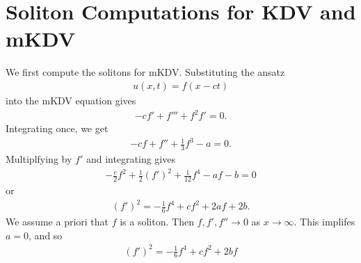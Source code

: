 \documentclass[12pt,reqno]{amsart}
\numberwithin{equation}{section}  %
\begin{document}
        \section{Soliton Computations for KDV and mKDV}
        We first compute the solitons for mKDV. Substituting the ansatz
        \begin{equation*}
        \begin{split}
        u(x,t) = f(x-ct)
        \end{split}
        \end{equation*}
        into the mKDV equation gives
        \begin{equation*}
        \begin{split}
          -cf' + f''' + f^{2}f' = 0.
        \end{split}
        \end{equation*}
        Integrating once, we get
        \begin{equation*}
        \begin{split}
          -cf + f'' + \frac{1}{3}f^{3} -a = 0.
        \end{split}
        \end{equation*}
        Multiplfying by $f'$ and integrating gives
        \begin{equation*}
        \begin{split}
          -\frac{c}{2}f^{2} + \frac{1}{2}(f')^{2} + \frac{1}{12}f^{4} -af -b =
          0
        \end{split}
        \end{equation*}
        or
        \begin{equation*}
        \begin{split}
          (f')^{2} = -\frac{1}{6}f^{4} + cf^{2} + 2af + 2b.
        \end{split}
        \end{equation*}
        We assume a priori that $f$ is a soliton. Then $f, f', f'' \to 0$ as $x
        \to \infty$. This implifes $a=0$, and so
        \begin{equation}
          \label{mkdv-ode-with-const}
        \begin{split}
          (f')^{2} = -\frac{1}{6}f^{4} + cf^{2} + 2bf
        \end{split}
        \end{equation}
\end{document}
